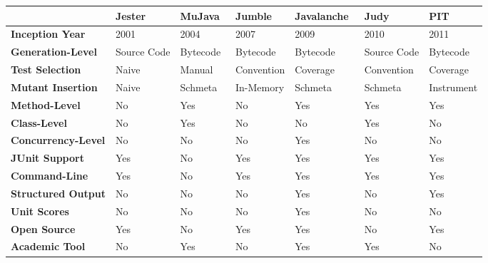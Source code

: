 \begin{landscape}
  \begin{table}[t!]
    \centering
    \begin{threeparttable}
      \begin{tabular}{|l|l|l|l|l|l|l|}
        \rowcolor[RGB]{169,196,223}
        \hline & \textbf{Jester~\cite{Jester}} & \textbf{MuJava~\cite{MOK05}} & \textbf{Jumble~\cite{Jumble}} & \textbf{Javalanche~\cite{SZ09}} & \textbf{Judy~\cite{MR10}} & \textbf{PIT~\cite{PIT}} \\
        \hline \cellcolor[RGB]{169,196,223} \textbf{Inception Year} & 2001 & 2004 & 2007 & 2009 & 2010 & 2011 \\
        \hline \cellcolor[RGB]{169,196,223} \textbf{Generation-Level} & Source Code & Bytecode & Bytecode & Bytecode & Source Code & Bytecode \\
        \hline \cellcolor[RGB]{169,196,223} \textbf{Test Selection} & Naive\tnote{f} & Manual & Convention & Coverage & Convention & Coverage \\
        \hline \cellcolor[RGB]{169,196,223} \textbf{Mutant Insertion} & Naive\tnote{f} & Schmeta & In-Memory & Schmeta & Schmeta\tnote{c} & Instrument \\
        \hline \cellcolor[RGB]{169,196,223} \textbf{Method-Level} & No & Yes & No & Yes & Yes & Yes \\
        \hline \cellcolor[RGB]{169,196,223} \textbf{Class-Level} & No & Yes & No & No & Yes\tnote{b} & No \\
        \hline \cellcolor[RGB]{169,196,223} \textbf{Concurrency-Level} & No & No & No & Yes & No & No \\
        \hline \cellcolor[RGB]{169,196,223} \textbf{JUnit Support} & Yes & No\tnote{c} & Yes & Yes & Yes & Yes \\
        \hline \cellcolor[RGB]{169,196,223} \textbf{Command-Line} & Yes & No & Yes & Yes & Yes & Yes \\
        \hline \cellcolor[RGB]{169,196,223} \textbf{Structured Output} & No & No & No & Yes & No & Yes \\
        \hline \cellcolor[RGB]{169,196,223} \textbf{Unit Scores} & No & No & No & Yes & No & No\tnote{g} \\
        \hline \cellcolor[RGB]{169,196,223} \textbf{Open Source} & Yes & No\tnote{d} & Yes & Yes & No & Yes \\
        \hline \cellcolor[RGB]{169,196,223} \textbf{Academic Tool} & No & Yes & No & Yes & Yes & No \\

\end{tabular}
\end{threeparttable}
\end{table}
\end{landscape}
